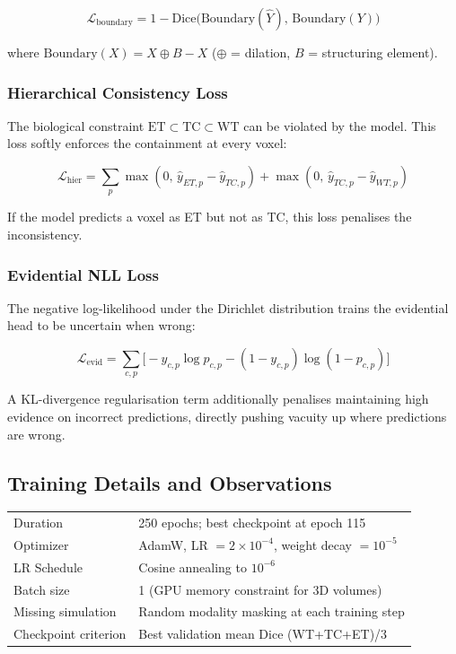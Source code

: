 \documentclass[12pt,a4paper]{article}
\begin{document}
\[
\mathcal{L}_{\text{boundary}} = 1 - \text{Dice}\bigl(\text{Boundary}(\hat{Y}),\,\text{Boundary}(Y)\bigr)
\]

where $\text{Boundary}(X) = X \oplus B - X$ ($\oplus$ = dilation, $B$ = structuring element).

\subsubsection{Hierarchical Consistency Loss}

The biological constraint $\text{ET} \subset \text{TC} \subset \text{WT}$ can be violated by the model. This loss softly enforces the containment at every voxel:

\[
\mathcal{L}_{\text{hier}} = \sum_p \max(0,\,\hat{y}_{ET,p} - \hat{y}_{TC,p}) + \max(0,\,\hat{y}_{TC,p} - \hat{y}_{WT,p})
\]

If the model predicts a voxel as ET but not as TC, this loss penalises the inconsistency.

\subsubsection{Evidential NLL Loss}

The negative log-likelihood under the Dirichlet distribution trains the evidential head to be uncertain when wrong:

\[
\mathcal{L}_{\text{evid}} = \sum_{c,p} \bigl[-y_{c,p}\log p_{c,p} - (1-y_{c,p})\log(1-p_{c,p})\bigr]
\]

A KL-divergence regularisation term additionally penalises maintaining high evidence on incorrect predictions, directly pushing vacuity up where predictions are wrong.

\subsection{Training Details and Observations}

\begin{center}
\begin{tabular}{ll}
\toprule
Duration & 250 epochs; best checkpoint at epoch 115 \\
Optimizer & AdamW, LR $= 2\times10^{-4}$, weight decay $= 10^{-5}$ \\
LR Schedule & Cosine annealing to $10^{-6}$ \\
Batch size & 1 (GPU memory constraint for 3D volumes) \\
Missing simulation & Random modality masking at each training step \\
Checkpoint criterion & Best validation mean Dice (WT+TC+ET)/3 \\
\bottomrule
\end{tabular}
\end{center}
\end{document}
